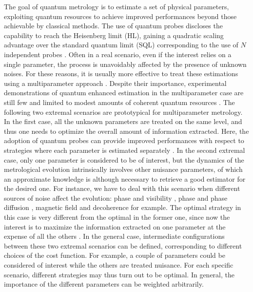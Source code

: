 \documentclass[aps,pra,twocolumn,notitlepage,superscriptaddress]{revtex4-1}
\begin{document}
The goal of quantum metrology is to estimate a set of physical parameters, exploiting quantum resources to achieve improved performances beyond those achievable by classical methods. The use of quantum probes discloses the capability to reach the Heisenberg limit (HL), gaining a quadratic scaling advantage over the standard quantum limit (SQL) corresponding to the use of $N$ independent probes \cite{Giovannetti1330,PhysRevLett.96.010401,Giovannetti,barbieri2022optical,avsreview2020}. Often in a real scenario, even if the interest relies on a single parameter, the process is unavoidably affected by the presence of unknown noises. For these reasons, it is usually more effective to treat these estimations using a multiparameter approach \cite{liu2019quantum,suzuki2020quantum,suzuki2020nuisance,doi:10.1080/23746149.2016.1230476,albarelli2020perspective}. Despite their importance, experimental demonstrations of quantum enhanced estimation in the multiparameter case are still few and limited to modest amounts of coherent quantum resources \cite{polino2019experimental,liu2021distributed,hong2021quantum,valeri2022experimental,cimini2022deep,avsreview2020}.
The following two extremal scenarios are prototypical for multiparameter metrology. 
In the first case, all the unknown parameters are treated on the same level, and thus one needs to optimize the overall amount of information extracted. Here, the adoption of quantum probes can provide improved performances with respect to strategies where each parameter is estimated separately \cite{humphreys2013quantum,PhysRevLett.128.040504,belliardo2021incompatibility,Yue}. 
In the second extremal case, only one parameter is considered to be of interest, but the dynamics of the metrological evolution intrinsically involves other nuisance parameters, of which an approximate knowledge is although necessary to retrieve a good estimator for the desired one. For instance, we have to deal with this scenario when different sources of noise affect the evolution: phase and visibility \cite{Roccia:18,roccia2017entangling,cimini2019quantum,cimini2019adaptive}, phase and phase diffusion \cite{Vidrighin,PhysRevLett.106.153603}, magnetic field and decoherence \cite{PhysRevA.84.012103} for example. The optimal strategy in this case is very different from the optimal in the former one, since now the interest is to maximize the information extracted on one parameter at the expense of all the others \cite{goldberg2020multiphase}. In the general case, intermediate configurations between these two extremal scenarios can be defined, corresponding to different choices of the cost function. For example, a couple of parameters could be considered of interest while the others are treated nuisance. For each specific scenario, different strategies may thus turn out to be optimal. In general, the importance of the different parameters can be weighted arbitrarily.
\end{document}
